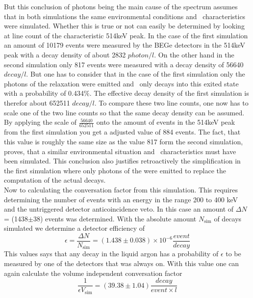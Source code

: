 \documentclass[encoding=utf8,british]{tumphthesis}
\begin{document}
But this conclusion of photons being the main cause of the spectrum assumes that in both simulations the same environmental conditions and \Kr\ characteristics were simulated.
Whether this is true or not can easily be determined by looking at line count of the characteristic 514keV peak.
In the case of the first simulation an amount of 10179 events were measured by the BEGe detectors in the 514keV peak with a decay density of about 2832 $\unit{photon}/\unit{l}$.
On the other hand in the second simulation only 817 events were measured with a decay density of 56640$\unit{decay}/\unit{l}$.
But one has to consider that in the case of the first simulation only the photons of the  relaxation were emitted and \Kr\ only decays into this exited state with a probability of 0.434$\%$.
The effective decay density of the first simulation is therefor about 652511 $\unit{decay}/\unit{l}$.
To compare these two line counts, one now has to scale one of the two line counts so that the same decay density can be assumed.
By applying the scale of $\frac{56640}{652511}$ onto the amount of events in the 514keV peak from the first simulation you get a adjusted value of 884 events.
The fact, that this value is roughly the same size as the value 817 form the second simulation, proves, that a similar environmental situation and \Kr\ characteristics must have been simulated.
This conclusion also justifies retroactively the simplification in the first simulation where only photons of the  were emitted to replace the computation of the actual decays.
\\

Now to calculating the conversation factor from this simulation.
This requires determining the number of events with an energy in the range 200 to 400 keV and the untriggered detector anticoincidence veto.
In this case an amount of $\Delta N$ = (1438$\pm$38) events was determined.
With the absolute amount $N_{\mathrm{sim}}$ of decays simulated we determine a detector efficiency of
\begin{equation*}
    \epsilon = \frac{\Delta N}{N_{\mathrm{sim}}} = (1.438\pm0.038)\times10^{-6} \frac{\unit{event}}{\unit{decay}}
\end{equation*}
This values says that any decay in the liquid argon has a probability of $\epsilon$ to be measured by one of the detectors that was always on.
With this value one can again calculate the volume independent conversation factor
\begin{equation*}
    \frac{1}{\epsilon V_{\mathrm{sim}}} = (39.38\pm1.04) \frac{\unit{decay}}{\unit{event} \times \unit{l} }
\end{equation*}
\\
\end{document}
